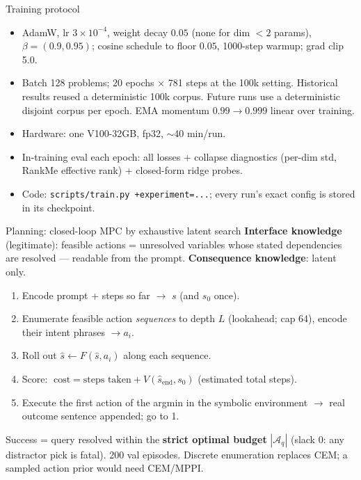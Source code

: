 \documentclass[aspectratio=169,10pt]{beamer}
\begin{document}
\begin{frame}{Training protocol}
\begin{itemize}\itemsep2pt
  \item AdamW, lr $3\!\times\!10^{-4}$, weight decay $0.05$ (none for dim
        $<2$ params), $\beta=(0.9,0.95)$; cosine schedule to floor $0.05$,
        1000-step warmup; grad clip 5.0.
  \item Batch 128 problems; 20 epochs $\times$ 781 steps at the 100k setting.
        Historical results reused a deterministic 100k corpus. Future runs use
        a deterministic disjoint corpus per epoch. EMA momentum
        $0.99\to0.999$ linear over training.
  \item Hardware: one V100-32GB, fp32, $\sim$40 min/run.
  \item In-training eval each epoch: all losses + collapse diagnostics
        (per-dim std, RankMe effective rank) + closed-form ridge probes.
  \item Code: \texttt{scripts/train.py +experiment=...}; every run's exact
        config is stored in its checkpoint.
\end{itemize}
\end{frame}

\begin{frame}{Planning: closed-loop MPC by exhaustive latent search}
\textbf{Interface knowledge} (legitimate): feasible actions = unresolved
variables whose stated dependencies are resolved --- readable from the prompt.
\textbf{Consequence knowledge}: latent only.
\medskip
\begin{enumerate}\itemsep1pt
  \item Encode prompt + steps so far $\to$ $s$ (and $s_0$ once).
  \item Enumerate feasible action \emph{sequences} to depth $L$
        (lookahead; cap 64), encode their intent phrases $\to a_i$.
  \item Roll out $\hat s \leftarrow F(\hat s, a_i)$ along each sequence.
  \item Score: $\;\text{cost} = \text{steps taken} + V(\hat s_{\text{end}},
        s_0)$ \; (estimated total steps).
  \item Execute the first action of the argmin in the symbolic environment
        $\to$ real outcome sentence appended; go to 1.
\end{enumerate}
\medskip
Success = query resolved within the \textbf{strict optimal budget}
$|\mathcal A_q|$ (slack 0: any distractor pick is fatal). 200 val episodes.
Discrete enumeration replaces CEM; a sampled action prior would need CEM/MPPI.
\end{frame}
\end{document}
